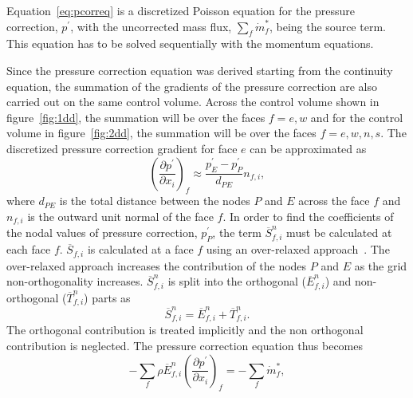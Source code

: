  Equation~\ref{eq:pcorreq} is a discretized Poisson equation for the pressure correction, $p^{\prime}$, with the uncorrected mass flux, $\sum_{f}\dot{m}_{f}^{\ast}$, being the source term. This equation has to be solved sequentially with the momentum equations. 

Since the pressure correction equation was derived starting from the continuity equation, the summation of the gradients of the pressure correction are also carried out on the same control volume. Across the control volume shown in figure~\ref{fig:1dd}, the summation will be over the faces $f=e,w$ and for the control volume in figure~\ref{fig:2dd}, the summation will be over the faces $f=e,w,n,s$. The discretized pressure correction gradient for face $e$ can be approximated as
\begin{equation*}
\left(\frac{\partial p^{\prime}}{\partial x_i}\right)_{f} \approx\frac{p_E^{\prime} - p_P^{\prime}}{d_{PE}}n_{f,i},
\end{equation*}
where $d_{PE}$ is the total distance between the nodes $P$ and $E$ across the face $f$ and $n_{f,i}$ is the outward unit normal of the face $f$. In order to find the coefficients of the nodal values of pressure correction, $p^{\prime}_P$, the term $\overline{S}_{f,i}^{n}$ must be calculated at each face $f$. $\overline{S}_{f,i}$ is calculated at a face $f$ using an over-relaxed approach~\cite{Moukalled}. The over-relaxed approach increases the contribution of the nodes $P$ and $E$ as the grid non-orthogonality increases. $\overline{S}_{f,i}^{n}$ is split into the orthogonal ($\overline{E}_{f,i}^{n}$) and non-orthogonal ($\overline{T}_{f,i}^{n}$) parts as
\begin{equation}
\overline{S}_{f,i}^{n} = \overline{E}_{f,i}^{n} + \overline{T}_{f,i}^{n}.
\end{equation}
The orthogonal contribution is treated implicitly and the non orthogonal contribution is neglected.  The pressure correction equation thus becomes
\begin{equation*}
-\sum_{f}\rho\overline{E}_{f,i}^{n}\left(\frac{\partial p^{\prime}}{\partial x_i}\right)_{f}=-\sum_{f}\dot{m}_{f}^{\ast},
\end{equation*}
